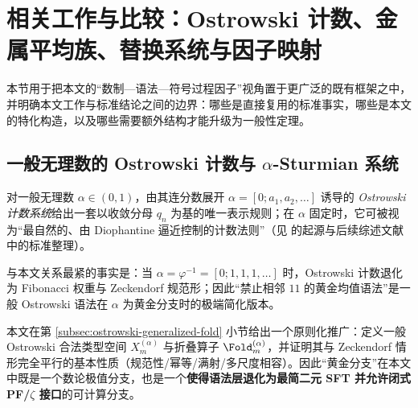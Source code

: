 \section{相关工作与比较：Ostrowski 计数、金属平均族、替换系统与因子映射}\label{sec:related-work}

本节用于把本文的“数制—语法—符号过程因子”视角置于更广泛的既有框架之中，并明确本文工作与标准结论之间的边界：哪些是直接复用的标准事实，哪些是本文的特化构造，以及哪些需要额外结构才能升级为一般性定理。

\subsection{一般无理数的 Ostrowski 计数与 \texorpdfstring{$\alpha$}{alpha}-Sturmian 系统}

对一般无理数 $\alpha\in(0,1)$，由其连分数展开 $\alpha=[0;a_1,a_2,\dots]$ 诱导的 \emph{Ostrowski 计数系统}给出一套以收敛分母 $q_n$ 为基的唯一表示规则；在 $\alpha$ 固定时，它可被视为“最自然的、由 Diophantine 逼近控制的计数法则”（见 \cite{Ostrowski1922} 的起源与后续综述文献中的标准整理）。

与本文关系最紧的事实是：当 $\alpha=\varphi^{-1}=[0;1,1,1,\dots]$ 时，Ostrowski 计数退化为 Fibonacci 权重与 Zeckendorf 规范形；因此“禁止相邻 $11$ 的黄金均值语法”是一般 Ostrowski 语法在 $\alpha$ 为黄金分支时的极端简化版本。

本文在第 \ref{subsec:ostrowski-generalized-fold} 小节给出一个原则化推广：定义一般 Ostrowski 合法类型空间 $X_m^{(\alpha)}$ 与折叠算子 $\Fold_m^{(\alpha)}$，并证明其与 Zeckendorf 情形完全平行的基本性质（规范性/幂等/满射/多尺度相容）。因此“黄金分支”在本文中既是一个数论极值分支，也是一个\textbf{使得语法层退化为最简二元 SFT 并允许闭式 PF/$\zeta$ 接口}的可计算分支。

